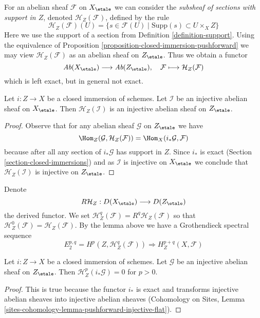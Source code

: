 \medskip\noindent
For an abelian sheaf $\mathcal{F}$ on $X_\etale$ we can consider
the {\it subsheaf of sections with support in $Z$}, denoted
$\mathcal{H}_Z(\mathcal{F})$, defined by the rule
$$
\mathcal{H}_Z(\mathcal{F})(U) =
\{s \in \mathcal{F}(U) \mid \text{Supp}(s) \subset U \times_X Z\}
$$
Here we use the support of a section from Definition \ref{definition-support}.
Using the equivalence of
Proposition \ref{proposition-closed-immersion-pushforward}
we may view $\mathcal{H}_Z(\mathcal{F})$ as an abelian sheaf on
$Z_\etale$. Thus we obtain a functor
$$
\textit{Ab}(X_\etale) \longrightarrow \textit{Ab}(Z_\etale),\quad
\mathcal{F} \longmapsto \mathcal{H}_Z(\mathcal{F})
$$
which is left exact, but in general not exact.

\begin{lemma}
\label{lemma-sections-with-support-acyclic}
Let $i : Z \to X$ be a closed immersion of schemes.
Let $\mathcal{I}$ be an injective abelian sheaf on $X_\etale$.
Then $\mathcal{H}_Z(\mathcal{I})$ is an injective abelian sheaf
on $Z_\etale$.
\end{lemma}

\begin{proof}
Observe that for any abelian sheaf $\mathcal{G}$ on $Z_\etale$
we have
$$
\Hom_Z(\mathcal{G}, \mathcal{H}_Z(\mathcal{F})) =
\Hom_X(i_*\mathcal{G}, \mathcal{F})
$$
because after all any section of $i_*\mathcal{G}$ has support in $Z$.
Since $i_*$ is exact (Section \ref{section-closed-immersions}) and as
$\mathcal{I}$ is injective on $X_\etale$ we conclude that
$\mathcal{H}_Z(\mathcal{I})$ is injective on $Z_\etale$.
\end{proof}

\noindent
Denote
$$
R\mathcal{H}_Z : D(X_\etale) \longrightarrow D(Z_\etale)
$$
the derived functor. We set
$\mathcal{H}^q_Z(\mathcal{F}) = R^q\mathcal{H}_Z(\mathcal{F})$ so that
$\mathcal{H}^0_Z(\mathcal{F}) = \mathcal{H}_Z(\mathcal{F})$.
By the lemma above we have a Grothendieck spectral sequence
$$
E_2^{p, q} = H^p(Z, \mathcal{H}^q_Z(\mathcal{F}))
\Rightarrow H^{p + q}_Z(X, \mathcal{F})
$$

\begin{lemma}
\label{lemma-cohomology-with-support-sheaf-on-support}
Let $i : Z \to X$ be a closed immersion of schemes.
Let $\mathcal{G}$ be an injective abelian sheaf on $Z_\etale$.
Then $\mathcal{H}^p_Z(i_*\mathcal{G}) = 0$ for $p > 0$.
\end{lemma}

\begin{proof}
This is true because the functor $i_*$ is exact and transforms
injective abelian sheaves into injective abelian sheaves
(Cohomology on Sites, Lemma
\ref{sites-cohomology-lemma-pushforward-injective-flat}).
\end{proof}

